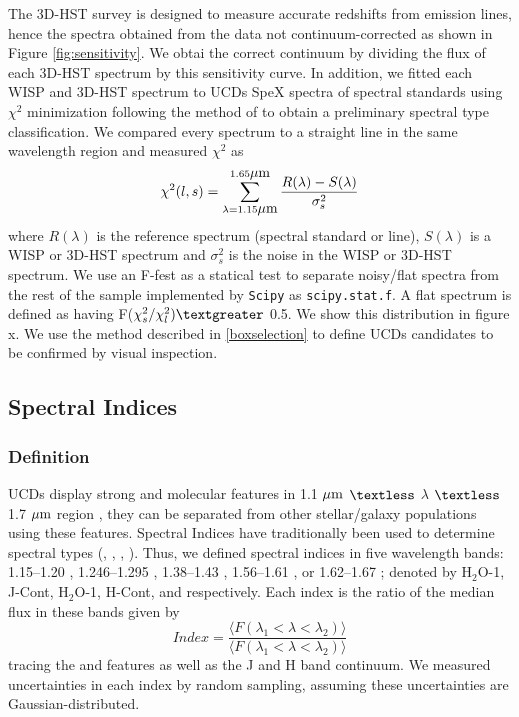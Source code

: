 \documentclass[manuscript]{aastex}
\begin{document}
The 3D-HST survey is designed to measure accurate redshifts from emission lines, hence the spectra obtained from the data not continuum-corrected as shown in Figure \ref{fig:sensitivity}. We obtai the correct continuum by dividing the flux of each 3D-HST spectrum by this sensitivity curve. In addition, we fitted each WISP and 3D-HST spectrum to UCDs SpeX spectra of spectral standards using $\chi^2$ minimization following the method of  \cite{2010ApJS..190..100K} to obtain a preliminary spectral type classification. We compared every spectrum to a straight line in the same wavelength  region and measured $\chi^2$ as
\begin{equation}
\chi^2(l, s) = \sum _{\lambda = 1.15 \micron} ^{ 1.65 \micron} \frac{R(\lambda)-S (\lambda)}{ \sigma_s ^2 }
\end{equation} where $R(\lambda)$ is the reference spectrum (spectral standard or line), $S (\lambda)$ is a WISP or 3D-HST spectrum and $\sigma_s ^2 $ is the noise in the WISP or 3D-HST spectrum. We use an F-fest as a statical test to separate noisy/flat spectra from the rest of the sample implemented by \texttt{Scipy} \citealt{scipy} as \texttt{scipy.stat.f}. A flat spectrum is defined as having F($\chi^2_s/ \chi ^2 _l) \textgreater $ 0.5. We show this distribution in figure x. We use the method described in \ref{boxselection} to define UCDs candidates to be confirmed by visual inspection. 

\subsection{Spectral Indices}\label{indices}

\subsubsection{Definition}

UCDs display strong \meth and \wat molecular features in 1.1 $\mbox{$\mu$m}$ $\textless$ $\lambda$ $\textless$ 1.7 $\mbox{$\mu$m}$  region \citep{2001PhDT.......116B}, they can be separated from other stellar/galaxy populations using these features. Spectral Indices have traditionally been used to determine spectral types (\citealt{1999AJ....117.1010T}, \citealt{2000AJ....119.3019C}, \citealt{2007ApJ...657..511A}, \citealt{2007ApJ...658..557B}). Thus, we defined  spectral indices in five wavelength bands: 1.15--1.20 \micron, 1.246--1.295 \micron, 1.38--1.43 \micron,  1.56--1.61 \micron, or 1.62--1.67 \micron; denoted by H$_2$O-1, J-Cont, H$_2$O-1, H-Cont, and \meth respectively. Each index is the ratio of the median flux in these bands given by \begin{equation} Index=\frac{ \langle  F(\lambda_1<\lambda < \lambda_2) \rangle }{  \langle F(\lambda_1 < \lambda <\lambda_2) \rangle }\end{equation} tracing the \wat and \meth features as well as the J and H band continuum. We measured uncertainties in each index by random sampling, assuming these uncertainties are Gaussian-distributed.
 
\end{document}
